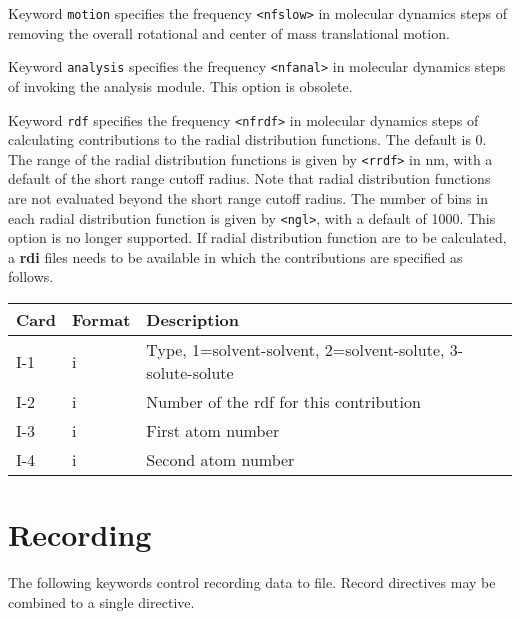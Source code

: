 \begin{description}
Keyword \verb+motion+
specifies the frequency \verb+<nfslow>+ in molecular dynamics steps of
removing the overall rotational and center of mass translational motion.

Keyword \verb+analysis+
specifies the frequency \verb+<nfanal>+ in molecular dynamics steps of
invoking the analysis module. This option is obsolete.

Keyword \verb+rdf+
specifies the frequency \verb+<nfrdf>+ in molecular dynamics steps of
calculating contributions to the radial distribution functions.
The default is 0. The range of the radial distribution
functions is given by \verb+<rrdf>+ in nm, with a default of the short
range cutoff radius. Note that radial distribution functions are not
evaluated beyond the short range cutoff radius. The number of
bins in each radial distribution function is given by \verb+<ngl>+, with
a default of 1000. This option is no longer supported.
If radial distribution function are to be
calculated, a {\bf rdi} files needs to be available in which the
contributions are specified as follows.
\begin{center}
\begin{tabular}{lll}
\hline\hline
Card & Format & Description \\ \hline
I-1  & i & Type, 1=solvent-solvent, 2=solvent-solute,
3-solute-solute\\
I-2  & i & Number of the rdf for this contribution\\
I-3  & i & First atom number \\
I-4  & i & Second atom number \\ 
\hline
\end{tabular}
\end{center}
\end{description}

\section{Recording}
The following keywords control recording data to file.
Record directives may be combined to a single directive.

